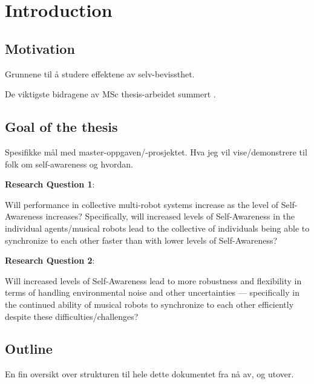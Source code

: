 \chapter{Introduction}
	
	
	
	
	
	
	
	
	\section{Motivation}
	
	Grunnene til å studere effektene av selv-bevissthet.
	\nl
	
	De viktigste bidragene av MSc thesis-arbeidet summert .
	
	
	
	
	
	
	
	
	
	\section{Goal of the thesis}
	
	Spesifikke mål  med master-oppgaven/-prosjektet. Hva jeg vil vise/demonstrere til folk  om self-awareness  og hvordan.
	\nl
	
	\textbf{Research Question 1}:
	
	Will performance in collective multi-robot systems increase as the level of Self-Awareness increases? Specifically, will increased levels of Self-Awareness in the individual agents/musical robots lead to the collective of individuals being able to synchronize to each other faster than with lower levels of Self-Awareness? \nl
	
	\textbf{Research Question 2}:
	
	Will increased levels of Self-Awareness lead to more robustness and flexibility in terms of handling environmental noise and other uncertainties — specifically in the continued ability of musical robots to synchronize to each other efficiently despite these difficulties/challenges? \nl
	
	
	
	
	
	
	
	\section{Outline}
	En fin  oversikt over strukturen til hele dette dokumentet fra nå av, og utover.
